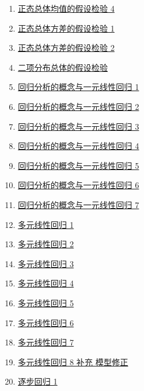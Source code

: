 \documentclass[11pt]{article}
\begin{document}
\begin{multicols}{2}
\begin{enumerate}
		\item \href{https://mp.weixin.qq.com/s/80Shgqs-tYujcxp0rGjfoQ}{正态总体均值的假设检验 4}	%
		\item \href{https://mp.weixin.qq.com/s/PLp_HnF09cQb8JREou-iOg}{正态总体方差的假设检验 1}	%
		\item \href{https://mp.weixin.qq.com/s/rjOPkhriWK8dUpyQfKB0jQ}{正态总体方差的假设检验 2}	%
		\item \href{https://mp.weixin.qq.com/s/7wRqc64o9RrRCULmLpzsZg}{二项分布总体的假设检验}	%
		\item \href{https://mp.weixin.qq.com/s/lA0j2HXD8vFzrYceGpNLMA}{回归分析的概念与一元线性回归 1}	%
		\item \href{https://mp.weixin.qq.com/s/JYRgeun9rIv_eKxGY6ns2g}{回归分析的概念与一元线性回归 2}	%
		\item \href{https://mp.weixin.qq.com/s/L8AAbA0buMJkktBbsoJ19g}{回归分析的概念与一元线性回归 3}	%
		\item \href{https://mp.weixin.qq.com/s/G6jlhY2pRShlYVlCzldtNQ}{回归分析的概念与一元线性回归 4}	%
		\item \href{https://mp.weixin.qq.com/s/FXne817GUt6spMCIMta4TA}{回归分析的概念与一元线性回归 5}	%
		\item \href{https://mp.weixin.qq.com/s/DPv0phE2cocGX8iO6TDIiQ}{回归分析的概念与一元线性回归 6}	%
		\item \href{https://mp.weixin.qq.com/s/RiubDcW45fwDizUTV-8r0A}{回归分析的概念与一元线性回归 7}	%
		\item \href{https://mp.weixin.qq.com/s/xZwNVJyXheYw6j52rdkQWQ}{多元线性回归 1}	%
		\item \href{https://mp.weixin.qq.com/s/sWqUKZHBeSjZMhENLGobAA}{多元线性回归 2}	%
		\item \href{https://mp.weixin.qq.com/s/yO4s89OVxYRRSIIDbjTplg}{多元线性回归 3}	%
		\item \href{https://mp.weixin.qq.com/s/OXiEwynMPZ3OrVhZeYTdhg}{多元线性回归 4}	%
		\item \href{https://mp.weixin.qq.com/s/IUo7myxrjqoF1qwBCEzyJw}{多元线性回归 5}	%
		\item \href{https://mp.weixin.qq.com/s/oFwRV3rIPrUr9iI_IygDNQ}{多元线性回归 6}	%
		\item \href{https://mp.weixin.qq.com/s/piiuvJHy05k-Dc2VLCGfWQ}{多元线性回归 7}	%
		\item \href{https://mp.weixin.qq.com/s/NBuzHEjqT8azV4jaO1IKfA}{多元线性回归 8 补充 模型修正}	%
		\item \href{https://mp.weixin.qq.com/s/9q9a3ovEYgZ5_QjqgN8iZg}{逐步回归 1}	%

\end{enumerate}
\end{multicols}
\end{document}
